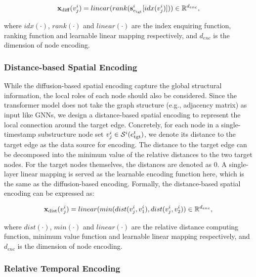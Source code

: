 \documentclass[10pt,journal,compsoc]{IEEEtran}
\begin{document}
\begin{equation}
\label{eq:diff_enc}
\mathbf{x}_{\rm diff}(v_j^i)= linear(rank(\mathbf{s}^i_{e_{\rm tgt}}[idx(v_j^i)])) \in \mathbb{R}^{d_{enc}},
\end{equation}

\noindent where $idx(\cdot)$, $rank(\cdot)$ and $linear(\cdot)$ are the index enquiring function, ranking function and learnable linear mapping respectively, and $d_{enc}$ is the dimension of node encoding. 

\subsubsection{Distance-based Spatial Encoding} \label{subsec:distance_encoding}

While the diffusion-based spatial encoding capture the global structural information, the local roles of each node should also be considered. Since the transformer model does not take the graph structure (e.g., adjacency matrix) as input like GNNs, we design a distance-based spatial encoding to represent the local connection around the target edge. Concretely, for each node in a single-timestamp substructure node set $v_j^i \in \mathcal{S}^i(e^t_{\rm tgt})$, we denote its distance to the target edge as the data source for encoding. The distance to the target edge can be decomposed into the minimum value of the relative distances to the two target nodes. For the target nodes themselves, the distances are denoted as $0$. A single-layer linear mapping is served as the learnable encoding function here, which is the same as the diffusion-based encoding. Formally, the distance-based spatial encoding can be expressed as:

\begin{equation}
\label{eq:dist_enc}
\mathbf{x}_{\rm dist}(v_j^i)= linear(min(dist(v_j^i,v_1^i),dist(v_j^i,v_2^i)) \in \mathbb{R}^{d_{enc}},
\end{equation}

\noindent where $dist(\cdot)$, $min(\cdot)$ and $linear(\cdot)$ are the relative distance computing function, minimum value function and learnable linear mapping respectively, and $d_{enc}$ is the dimension of node encoding. 

\subsubsection{Relative Temporal Encoding} \label{subsec:temporal_encoding}
\end{document}
